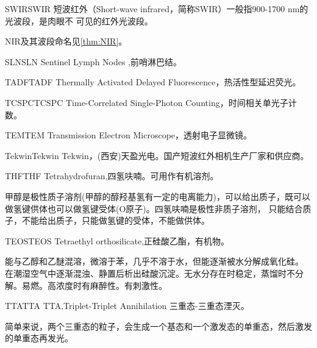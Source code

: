 \documentclass[cn,11pt,chinese]{elegantbook}
\begin{document}
 
\begin{theorem}{SWIR}{SWIR} 
  短波红外（Short-wave infrared，简称SWIR）一般指900-1700 nm的光波段，是肉眼不
  可见的红外光波段。
  \end{theorem} 
\begin{note}
  NIR及其波段命名见\vref{thm:NIR}。
\end{note}

\begin{theorem}{SLN}{SLN} 
  Sentinel Lymph Nodes ,前哨淋巴结。
  \end{theorem} 


  \begin{theorem}{TADF}{TADF} 
    Thermally Activated Delayed Fluorescence，热活性型延迟荧光。
    \end{theorem}  


\begin{theorem}{TCSPC}{TCSPC} 
  Time-Correlated Single-Photon Counting，时间相关单光子计数。
\end{theorem}  

\begin{theorem}{TEM}{TEM} 
  Transmission Electron Microscope，透射电子显微镜。
\end{theorem}  

\begin{theorem}{Tekwin}{Tekwin} 
  Tekwin，(西安)天盈光电。国产短波红外相机生产厂家和供应商。
\end{theorem}  

\begin{theorem}{THF}{THF} 
Tetrahydrofuran,四氢呋喃。可用作有机溶剂。
\end{theorem}  

\begin{remark}
甲醇是极性质子溶剂(甲醇的醇羟基氢有一定的电离能力)，可以给出质子，既可以做氢键供体也可以做氢键受体(O原子)。四氢呋喃是极性非质子溶剂，
只能结合质子，不能给出质子，只能做氢键的受体，不能做供体。
\end{remark}

\begin{theorem}{TEOS}{TEOS} 
  Tetraethyl orthosilicate,正硅酸乙酯，有机物。
  
  能与乙醇和乙醚混溶，微溶于苯，几乎不溶于水，但能逐渐被水分解成氧化硅。
  在潮湿空气中逐渐混浊、静置后析出硅酸沉淀。无水分存在时稳定，蒸馏时不分解。易燃。高浓度时有麻醉性。有刺激性。
\end{theorem}  


\begin{theorem}{TTA}{TTA} 
  TTA,Triplet-Triplet Annihilation 三重态-三重态湮灭。
 
 简单来说，两个三重态的粒子，会生成一个基态和一个激发态的单重态，然后激发的单重态再发光。 
\end{theorem}  
\end{document}
